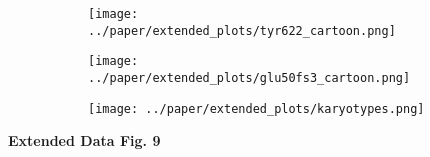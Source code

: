 \begin{figure}[H]
    \begin{subfigure}[t]{0.4\textwidth}
        \caption{}
        \hspace{1.5cm}
        \texttt{[image: ../paper/extended\_plots/tyr622\_cartoon.png]}        
    \end{subfigure}  
    \hspace{1.5cm}
    \begin{subfigure}[t]{0.4\textwidth}
        \caption{}
        \texttt{[image: ../paper/extended\_plots/glu50fs3\_cartoon.png]}        
    \end{subfigure}  
    \par
    \begin{subfigure}[t]{0.9\textwidth}
        \caption{}
        \hspace{1.5cm}
        \texttt{[image: ../paper/extended\_plots/karyotypes.png]}        
    \end{subfigure}  
\end{figure}
\textbf{Extended Data Fig. 9}